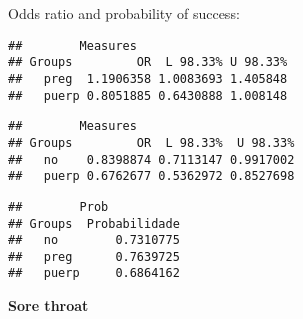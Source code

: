 \documentclass[
]{article}
\newenvironment{Shaded}{\begin{snugshade}}{\end{snugshade}}
\newcommand{\CommentTok}[1]{\textcolor[rgb]{0.56,0.35,0.01}{\textit{#1}}}
\newcommand{\KeywordTok}[1]{\textcolor[rgb]{0.13,0.29,0.53}{\textbf{#1}}}
\newcommand{\NormalTok}[1]{#1}
\newcommand{\OperatorTok}[1]{\textcolor[rgb]{0.81,0.36,0.00}{\textbf{#1}}}
\begin{document}
Odds ratio and probability of success:

\begin{Shaded}
\end{Shaded}

\begin{verbatim}
##        Measures
## Groups         OR  L 98.33% U 98.33%
##   preg  1.1906358 1.0083693 1.405848
##   puerp 0.8051885 0.6430888 1.008148
\end{verbatim}

\begin{Shaded}
\end{Shaded}

\begin{verbatim}
##        Measures
## Groups         OR  L 98.33%  U 98.33%
##   no    0.8398874 0.7113147 0.9917002
##   puerp 0.6762677 0.5362972 0.8527698
\end{verbatim}

\begin{Shaded}
\end{Shaded}

\begin{verbatim}
##        Prob
## Groups  Probabilidade
##   no        0.7310775
##   preg      0.7639725
##   puerp     0.6864162
\end{verbatim}

\textbf{Sore throat}
\end{document}
